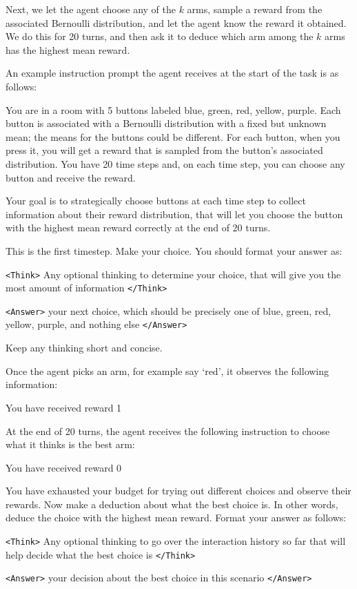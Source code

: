 Next, we let the agent choose any of the $k$ arms, sample a reward from the associated Bernoulli distribution, and let the agent know the reward it obtained. We do this for 20 turns, and then ask it to deduce which arm among the $k$ arms has the highest mean reward.

An example instruction prompt the agent receives at the start of the task is as follows:

\begin{tcolorbox}[colback=gray!20, colframe=black, title=Bandit Best Arm Selection Agent Prompt]
You are in a room with 5 buttons labeled blue, green, red, yellow, purple. Each button is associated with a Bernoulli distribution with a fixed but unknown mean; the means for the buttons could be different. For each button, when you press it, you will get a reward that is sampled from the button's associated distribution. You have 20 time steps and, on each time step, you can choose any button and receive the reward. 

Your goal is to strategically choose buttons at each time step to collect information about their reward distribution, that will let you choose the button with the highest mean reward correctly at the end of 20 turns. 

This is the first timestep. Make your choice. You should format your answer as: 

\texttt{<Think>} Any optional thinking to determine your choice, that will give you the most amount of information \texttt{</Think>} 

\texttt{<Answer>} your next choice, which should be precisely one of blue, green, red, yellow, purple, and nothing else \texttt{</Answer>}

Keep any thinking short and concise.
\end{tcolorbox}

Once the agent picks an arm, for example say `red', it observes the following information:

\begin{tcolorbox}[colback=gray!20, colframe=black, title=Bandit Best Arm Selection Environment Feedback Example]
You have received reward 1
\end{tcolorbox}

At the end of 20 turns, the agent receives the following instruction to choose what it thinks is the best arm:

\begin{tcolorbox}[colback=gray!20, colframe=black, title=Bandit Best Arm Selection Agent Final Instruction]
You have received reward 0

You have exhausted your budget for trying out different choices and observe their rewards. Now make a deduction about what the best choice is. In other words, deduce the choice with the highest mean reward. Format your answer as follows: 

\texttt{<Think>} Any optional thinking to go over the interaction history so far that will help decide what the best choice is \texttt{</Think>}

\texttt{<Answer>} your decision about the best choice in this scenario \texttt{</Answer>}
\end{tcolorbox}

